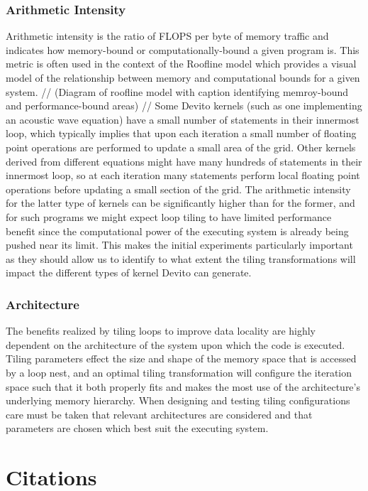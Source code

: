 \documentclass[a4paper,12pt,twoside]{report}
\begin{document}
\subsection{Arithmetic Intensity}
Arithmetic intensity is the ratio of FLOPS per byte of memory traffic and indicates how memory-bound or computationally-bound a given program is.
This metric is often used in the context of the Roofline model which provides a visual model of the relationship between memory and computational bounds for a
given system. 
//
(Diagram of roofline model with caption  identifying memroy-bound and performance-bound areas)
//
Some Devito kernels (such as one implementing an acoustic wave equation) have a small number of statements in their innermost loop, which typically
implies that upon each iteration a small number of floating point operations are performed to update a small area of the grid. Other kernels derived from different 
equations might have many hundreds of statements in their innermost loop, so at each iteration many statements perform local floating point operations before updating
a small section of the grid. The arithmetic intensity for the latter type of kernels can be significantly higher than for the former, and for such programs
we might expect loop tiling to have limited performance benefit since the computational power of the executing system is already being pushed near its limit. This makes
the initial experiments particularly important as they should allow us to identify to what extent the tiling transformations will impact the different types of kernel
Devito can generate.

\subsection{Architecture}
The benefits realized by tiling loops to improve data locality are highly dependent on the architecture of the system upon which the code is executed. Tiling parameters
effect the size and shape of the memory space that is accessed by a loop nest, and an optimal tiling transformation will configure the iteration space such that it both
properly fits and makes the most use of the architecture's underlying memory hierarchy. When designing and testing tiling configurations care must be taken that
relevant architectures are considered and that parameters are chosen which best suit the executing system.

\chapter{Citations}


\end{document}
